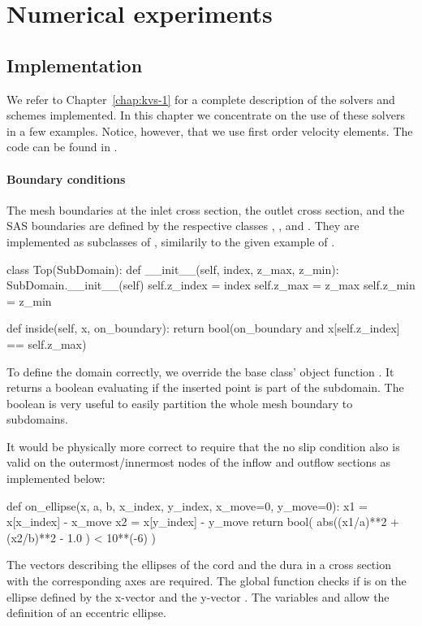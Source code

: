 \section{Numerical experiments}
\begin{minipage}{10cm}
\subsection{Implementation}
We refer to Chapter~\ref{chap:kvs-1} for a complete description of the solvers 
and schemes implemented. In this chapter we concentrate on the use  
of these solvers in a few examples. Notice, however, that we use
first order velocity elements. The code can be found in .  

\end{minipage}

\paragraph{Boundary conditions}  
The mesh boundaries at the inlet cross section, the outlet cross section, and the SAS boundaries are defined by the respective classes , , and . They are implemented as subclasses of , similarily to the given example of .
\begin{python}
class Top(SubDomain):
	def __init__(self, index, z_max, z_min):
		SubDomain.__init__(self)
		self.z_index = index
		self.z_max = z_max
		self.z_min = z_min

	def inside(self, x, on_boundary):
		return bool(on_boundary and x[self.z_index] == self.z_max)
\end{python}
To define the domain correctly, we override the base class' object function . It returns a boolean evaluating if the inserted point  is part of the subdomain. The boolean  is very useful to easily partition the whole mesh boundary to subdomains.

It would be physically more correct to require that the no slip condition also is valid on the outermost/innermost nodes of the inflow and outflow sections as implemented below:
\begin{python}
def on_ellipse(x, a, b, x_index, y_index, x_move=0, y_move=0):
	x1 = x[x_index] - x_move
	x2 = x[y_index] - y_move
	return bool( abs((x1/a)**2 + (x2/b)**2 - 1.0 ) < 10**(-6) )
\end{python}
The vectors describing the ellipses of the cord and the dura in a cross section with the corresponding axes are required. The global function  checks if  is on the ellipse defined by the x-vector  and the y-vector . The variables  and  allow the definition of an eccentric ellipse.

